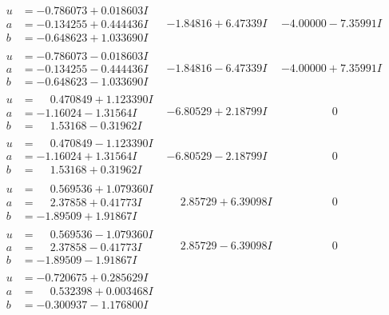 \documentclass[1p]{elsarticle_modified}
\theoremstyle{definition}
\begin{document}
$$\begin{array}{c|c|c}
 \hline 
\begin{aligned}
u &= -0.786073 + 0.018603 I \\
a &= -0.134255 + 0.444436 I \\
b &= -0.648623 + 1.033690 I\end{aligned}
 & -1.84816 + 6.47339 I & -4.00000 - 7.35991 I \\ \hline\begin{aligned}
u &= -0.786073 - 0.018603 I \\
a &= -0.134255 - 0.444436 I \\
b &= -0.648623 - 1.033690 I\end{aligned}
 & -1.84816 - 6.47339 I & -4.00000 + 7.35991 I \\ \hline\begin{aligned}
u &= \phantom{-}0.470849 + 1.123390 I \\
a &= -1.16024 - 1.31564 I \\
b &= \phantom{-}1.53168 - 0.31962 I\end{aligned}
 & -6.80529 + 2.18799 I & \phantom{-0.000000 } 0 \\ \hline\begin{aligned}
u &= \phantom{-}0.470849 - 1.123390 I \\
a &= -1.16024 + 1.31564 I \\
b &= \phantom{-}1.53168 + 0.31962 I\end{aligned}
 & -6.80529 - 2.18799 I & \phantom{-0.000000 } 0 \\ \hline\begin{aligned}
u &= \phantom{-}0.569536 + 1.079360 I \\
a &= \phantom{-}2.37858 + 0.41773 I \\
b &= -1.89509 + 1.91867 I\end{aligned}
 & \phantom{-}2.85729 + 6.39098 I & \phantom{-0.000000 } 0 \\ \hline\begin{aligned}
u &= \phantom{-}0.569536 - 1.079360 I \\
a &= \phantom{-}2.37858 - 0.41773 I \\
b &= -1.89509 - 1.91867 I\end{aligned}
 & \phantom{-}2.85729 - 6.39098 I & \phantom{-0.000000 } 0 \\ \hline\begin{aligned}
u &= -0.720675 + 0.285629 I \\
a &= \phantom{-}0.532398 + 0.003468 I \\
b &= -0.300937 - 1.176800 I\end{aligned}

\end{array}$$
\end{document}
